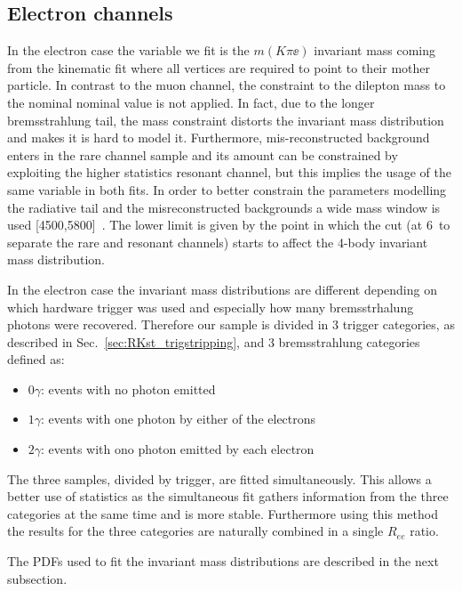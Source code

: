 \subsection{Electron channels}
\label{sec:RKst_fit_ee}

In the electron case the variable we fit is the $m(K\pi\ee)$ invariant mass coming from the kinematic
fit where all vertices are required to point to their mother particle. 
In contrast to the muon channel,
the constraint to the dilepton mass to the nominal \jpsi nominal value is not applied.
In fact, due to the longer bremsstrahlung tail, the \jpsi mass constraint distorts the invariant mass distribution
and makes it is hard to model it. Furthermore, mis-reconstructed background enters in the rare channel sample and
its amount can be constrained by exploiting the higher statistics resonant channel, but this implies
the usage of the same variable in both fits.
In order to better constrain the parameters modelling the radiative tail and the misreconstructed
backgrounds a wide mass window is used [4500,5800]~\mevcc. The lower limit is given
by the point in which the \qsq cut (at 6~\gevgevcccc to separate the rare and resonant channels)
starts to affect the 4-body invariant mass distribution.

In the electron case the invariant mass distributions are different depending on which hardware
trigger was used and especially how many bremsstrhalung photons were recovered.
Therefore our sample is divided in 3 trigger categories, as described in
Sec.~\ref{sec:RKst_trigstripping}, and 3 bremsstrahlung categories defined as:
%
\begin{itemize}
\item $0\gamma$: events with no photon emitted
\item $1\gamma$: events with one photon by either of the electrons
\item $2\gamma$: events with ono photon emitted by each electron
\end{itemize}
%
The three samples, divided by trigger, are fitted simultaneously.
This allows a better use of statistics as the simultaneous fit
gathers information from the three categories at the same time and is more stable.
Furthermore using this method the results for the three categories are
naturally combined in a single $R_{ee}$ ratio.

The PDFs used to fit the invariant mass distributions are described in the next subsection.



